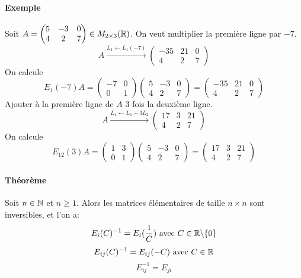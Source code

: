 \paragraph{Exemple} Soit $A=\begin{pmatrix}5&-3&0\\4&2&7\end{pmatrix}\in M_{2\times3}(\mathbb{R})$. On veut multiplier la première ligne par $-7$.
$$A\xrightarrow{L_1\leftarrow L_1(-7)}\begin{pmatrix}-35&21&0\\4&2&7\end{pmatrix}$$
On calcule
$$E_1(-7)A=\begin{pmatrix}-7&0\\0&1\end{pmatrix}\begin{pmatrix}5&-3&0\\4&2&7\end{pmatrix}=\begin{pmatrix}-35&21&0\\4&2&7\end{pmatrix}$$
Ajouter à la première ligne de $A$ $3$ fois la deuxième ligne.
$$A\xrightarrow{L_1\leftarrow L_1+3L_2}\begin{pmatrix}17&3&21\\4&2&7\end{pmatrix}$$
On calcule
$$E_{1 2}(3)A=\begin{pmatrix}1&3\\0&1\end{pmatrix}\begin{pmatrix}5&-3&0\\4&2&7\end{pmatrix}=\begin{pmatrix}17&3&21\\4&2&7\end{pmatrix}$$

\paragraph{Théorème} Soit $n\in\mathbb{N}$ et $n\ge1$. Alors les matrices élémentaires de taille $n\times n$ sont inversibles, et l'on a:
$$E_i(C)^{-1}=E_i(\frac{1}{C}) \text{ avec }C\in\mathbb{R}\backslash\{0\}$$
$$E_{i j}(C)^{-1}=E_{i j}(-C) \text{ avec }C\in\mathbb{R}$$
$$E_{i j}^{-1}=E_{j i}$$

